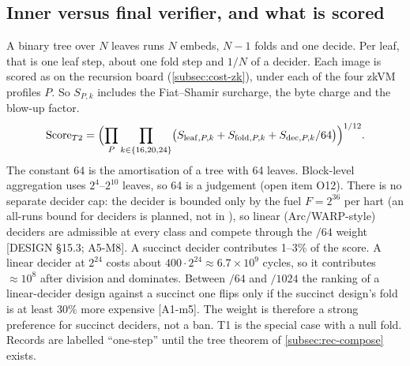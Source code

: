 \subsection{Inner versus final verifier, and what is scored}\label{subsec:rec-score}

A binary tree over $N$ leaves runs $N$ embeds, $N-1$ folds and one decide. Per leaf, that is one leaf
step, about one fold step and $1/N$ of a decider. Each image is scored as on the recursion board
(\cref{subsec:cost-zk}), under each of the four zkVM profiles $P$. So $S_{P,k}$ includes the
Fiat--Shamir surcharge, the byte charge and the blow-up factor.
\[
  \mathrm{Score}_{T2}=\Bigl(\prod_{P}\prod_{k\in\{16,20,24\}}\bigl(S_{\mathrm{leaf},P,k}+S_{\mathrm{fold},P,k}
     +S_{\mathrm{dec},P,k}/64\bigr)\Bigr)^{1/12}.
\]
The constant $64$ is the amortisation of a tree with 64 leaves. Block-level aggregation uses
$2^4$--$2^{10}$ leaves, so 64 is a judgement (open item O12). There is no separate decider cap:
the decider is bounded only by the fuel $F=2^{36}$ per hart (an all-runs bound for deciders is
planned, not in ), so linear (Arc/WARP-style) deciders are
admissible at every class and compete through the $/64$ weight [DESIGN §15.3; A5-M8]. A succinct
decider contributes 1--3\% of the score. A linear decider at $2^{24}$ costs about
$400\cdot2^{24}\approx6.7\times10^9$ cycles, so it contributes $\approx10^8$ after division and
dominates. Between $/64$ and $/1024$ the ranking of a linear-decider design against a succinct one
flips only if the succinct design's fold is at least 30\% more expensive [A1-m5]. The weight is
therefore a strong preference for succinct deciders, not a ban.
T1 is the special case with a null fold. Records are labelled \enquote{one-step} until the tree
theorem of \cref{subsec:rec-compose} exists.

